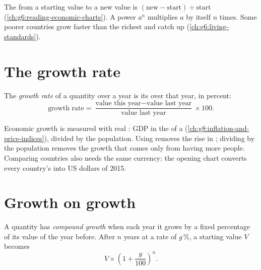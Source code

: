 \begin{recall}
The  from a starting value to a new value is $(\text{new} - \text{start}) \div
\text{start}$ (\cref{ch:g6:reading-economic-charts}). A power $a^n$ multiplies $a$ by itself $n$
times. Some poorer countries grow faster than the richest and catch up
(\cref{ch:g6:living-standards}).
\end{recall}

\section{The growth rate}

\begin{definition}\label{def:g8:growth-and-compounding:growth-rate}
The \emph{growth rate} of a quantity over a year is its  over
that year, in percent:
\[
\text{growth rate} = \frac{\text{value this year} - \text{value last year}}{\text{value last
year}} \times 100.
\]
\end{definition}

\begin{measure}
Economic growth is measured with real : GDP in the  of a 
(\cref{ch:g8:inflation-and-price-indices}), divided by the population. Using  removes the
rise in ; dividing by the population removes the growth that comes only from having more
people. Comparing countries also needs the same currency: the opening chart converts every
country's  into US dollars of 2015.
\end{measure}

\section{Growth on growth}

\begin{definition}\label{def:g8:growth-and-compounding:compound-growth}
A quantity has \emph{compound growth} when each year it grows by a fixed
percentage of its value of the year before. After $n$ years at a rate of $g\,\%$, a starting value
$V$ becomes
\[
V \times \left(1 + \frac{g}{100}\right)^{n}.
\]
\end{definition}

